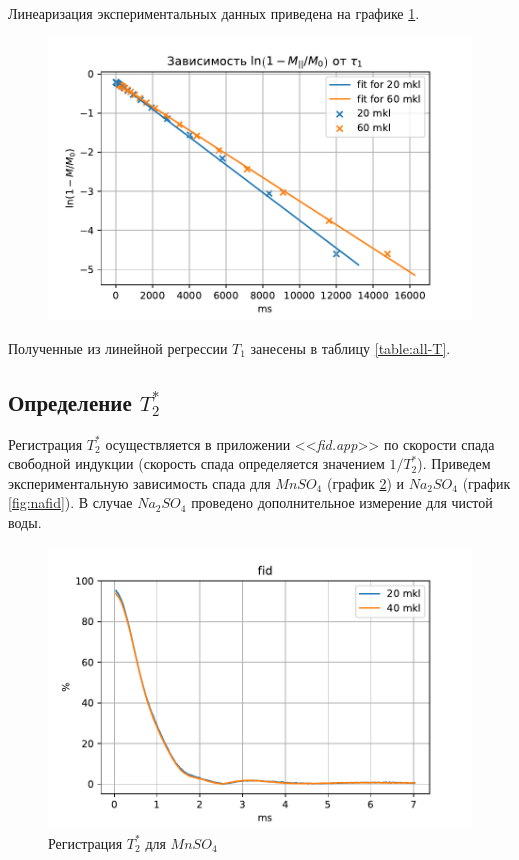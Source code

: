 Линеаризация экспериментальных данных приведена на графике \ref{fig:nat1reg}.
	
\begin{figure}[h]
	\hspace{-5em}
	\includegraphics[width=1.2\linewidth]{data/Na_T_1_reg}
	\caption{}
	\label{fig:nat1reg}
\end{figure}

Полученные из линейной регрессии $ T_1 $ занесены в таблицу \ref{table:all-T}.

\subsection{Определение $ T_2^* $}
Регистрация $ T_2^* $ осуществляется в приложении <<\textit{fid.app}>> по скорости спада свободной индукции (скорость спада определяется значением $ 1/T_2^* $). Приведем экспериментальную зависимость спада для $ Mn SO_4 $ (график \ref{fig:mnfid}) и $ Na_2 SO_4 $ (график \ref{fig:nafid}). В случае $ Na_2 SO_4 $ проведено дополнительное измерение для чистой воды.

\begin{figure}[h]
	\hspace{-5em}
	\includegraphics[width=1.2\linewidth]{data/Mn_fid}
	\caption{Регистрация $ T_2^* $ для $ Mn SO_4 $}
	\label{fig:mnfid}
\end{figure}


